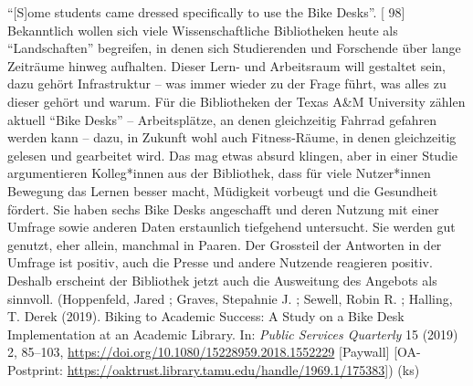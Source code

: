 \documentclass[a4paper,
fontsize=11pt,
oneside,
numbers=noperiodatend,
parskip=half-,
bibliography=totoc,
final
]{scrartcl}
\begin{document}
\enquote{{[}S{]}ome students came dressed specifically to use the Bike
Desks}. {[} 98{]} Bekanntlich wollen sich viele Wissenschaftliche
Bibliotheken heute als \enquote{Landschaften} begreifen, in denen sich
Studierenden und Forschende über lange Zeiträume hinweg aufhalten.
Dieser Lern- und Arbeitsraum will gestaltet sein, dazu gehört
Infrastruktur -- was immer wieder zu der Frage führt, was alles zu
dieser gehört und warum. Für die Bibliotheken der Texas A\&M University
zählen aktuell \enquote{Bike Desks} -- Arbeitsplätze, an denen
gleichzeitig Fahrrad gefahren werden kann -- dazu, in Zukunft wohl auch
Fitness-Räume, in denen gleichzeitig gelesen und gearbeitet wird. Das
mag etwas absurd klingen, aber in einer Studie argumentieren
Kolleg*innen aus der Bibliothek, dass für viele Nutzer*innen Bewegung
das Lernen besser macht, Müdigkeit vorbeugt und die Gesundheit fördert.
Sie haben sechs Bike Desks angeschafft und deren Nutzung mit einer
Umfrage sowie anderen Daten erstaunlich tiefgehend untersucht. Sie
werden gut genutzt, eher allein, manchmal in Paaren. Der Grossteil der
Antworten in der Umfrage ist positiv, auch die Presse und andere
Nutzende reagieren positiv. Deshalb erscheint der Bibliothek jetzt auch
die Ausweitung des Angebots als sinnvoll. (Hoppenfeld, Jared ; Graves,
Stepahnie J. ; Sewell, Robin R. ; Halling, T. Derek (2019). Biking to
Academic Success: A Study on a Bike Desk Implementation at an Academic
Library. In: \emph{Public Services Quarterly} 15 (2019) 2, 85--103,
\url{https://doi.org/10.1080/15228959.2018.1552229} {[}Paywall{]}
{[}OA-Postprint:
\url{https://oaktrust.library.tamu.edu/handle/1969.1/175383}{]}) (ks)
\end{document}
